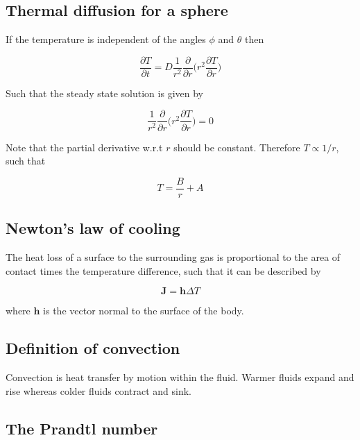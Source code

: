 \documentclass[a4paper]{article}
\begin{document}
\subsection{Thermal diffusion for a sphere}

If the temperature is independent of the angles $\phi$ and $\theta$ then

\begin{equation}
	\frac{\partial T}{\partial t}=D\frac{1}{r^2}\frac{\partial}{\partial r}\bigg(r^2\frac{\partial T}{\partial r}\bigg)
\end{equation}

Such that the steady state solution is given by 

\begin{equation}
	\frac{1}{r^2}\frac{\partial}{\partial r}\bigg(r^2\frac{\partial T}{\partial r}\bigg)=0
\end{equation}

Note that the partial derivative w.r.t $r$ should be constant. Therefore $T\propto 1/r$, such that

\begin{equation}
	T=\frac{B}{r}+A
\end{equation}

\subsection{Newton's law of cooling}

The heat loss of a surface to the surrounding gas is proportional to the area of contact times the temperature difference, such that it can be described by

\begin{equation}
	\bm{J}=\bm{h}\Delta T
\end{equation}

where $\bm{h}$ is the vector normal to the surface of the body.

\subsection{Definition of convection}

Convection is heat transfer by motion within the fluid. Warmer fluids expand and rise whereas colder fluids contract and sink.

\subsection{The Prandtl number}
\end{document}
